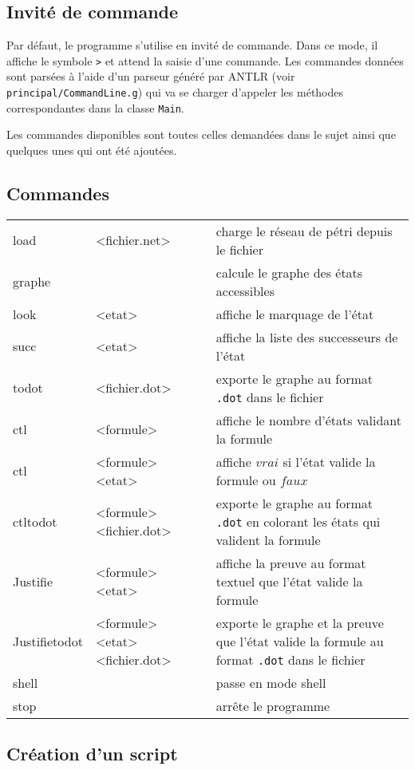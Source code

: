 \documentclass[dvipsnames]{report}
\begin{document}
\subsection{Invité de commande}

Par défaut, le programme s'utilise en invité de commande. Dans ce mode, il affiche le symbole \texttt{>} et attend la saisie d'une commande. Les commandes données sont parsées à l'aide d'un parseur généré par ANTLR (voir \texttt{principal/CommandLine.g}) qui va se charger d'appeler les méthodes correspondantes dans la classe \texttt{Main}.

Les commandes disponibles sont toutes celles demandées dans le sujet ainsi que quelques unes qui ont été ajoutées.

\subsection{Commandes}

\noindent\begin{tabularx}{\linewidth}{@{}l l X@{}}
load & <fichier.net> & charge le réseau de pétri depuis le fichier \\
graphe & & calcule le graphe des états accessibles \\
look & <etat> & affiche le marquage de l'état \\
succ & <etat> & affiche la liste des successeurs de l'état \\
todot & <fichier.dot> & exporte le graphe au format \texttt{.dot} dans le fichier \\
ctl & <formule> & affiche le nombre d'états validant la formule \\
ctl & <formule> <etat> & affiche $vrai$ si l'état valide la formule ou $faux$ \\
ctltodot & <formule> <fichier.dot> & exporte le graphe au format \texttt{.dot} en colorant les états qui valident la formule \\
Justifie & <formule> <etat> & affiche la preuve au format textuel que l'état valide la formule \\
Justifietodot & <formule> <etat> <fichier.dot> & exporte le graphe et la preuve que l'état valide la formule au format \texttt{.dot} dans le fichier \\
shell & & passe en mode shell \\
stop & & arrête le programme \\
\end{tabularx}

\subsection{Création d'un script}
\end{document}
